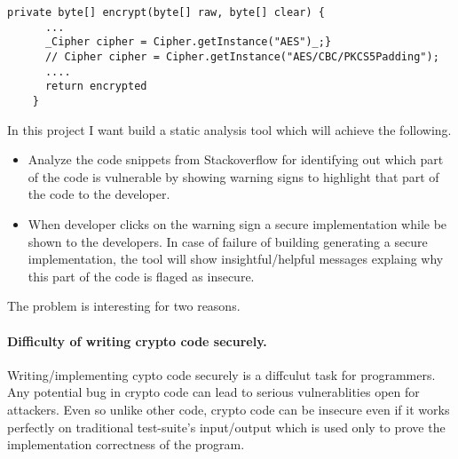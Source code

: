




\begin{lstlisting}[caption={A real code snippet taken from Stackoverflow. I want to build a tool which after analyzing the code snippet will highlight the part of the code that is insecure and suggest an alternative secure implementation as showed in the figure.}, label={fig:motivating-example}]
    private byte[] encrypt(byte[] raw, byte[] clear) {
      ...
      _Cipher cipher = Cipher.getInstance("AES")_;}
      // Cipher cipher = Cipher.getInstance("AES/CBC/PKCS5Padding");
      ....
      return encrypted
    }
     \end{lstlisting}
   \label{into}
   In this project I want build a static analysis tool which will achieve the following. 
   \begin{itemize}
   \item  Analyze the code snippets from Stackoverflow for identifying out which part of the code is vulnerable by showing warning signs to highlight that part of the code to the developer.
   \item When developer clicks on the warning sign a secure implementation while be shown to the developers. In case of failure of building generating a secure implementation, the tool will show insightful/helpful messages explaing why this part of the code is flaged as insecure.  
   \end{itemize}
   
   The problem is interesting for two reasons. 
   
   \paragraph{Difficulty of writing crypto code securely.} Writing/implementing cypto code securely is a diffculut task for programmers. Any potential bug in crypto code can lead to serious vulnerablities open for attackers.
   Even so unlike other code, crypto code can be insecure even if it works 
   perfectly on traditional test-suite's input/output which is used only to prove the implementation correctness of the program.
   
